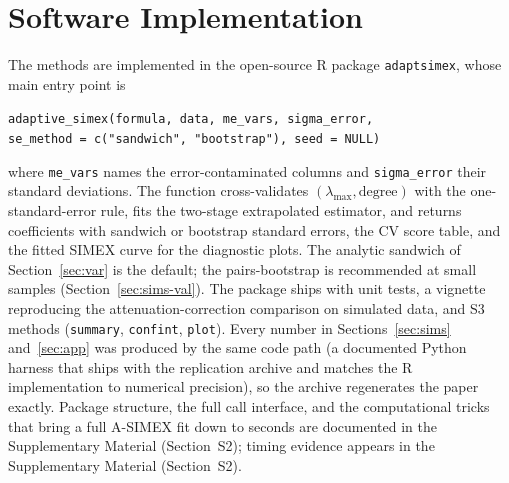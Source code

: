 \section{Software Implementation}\label{sec:software}

The methods are implemented in the open-source R package
\texttt{adaptsimex}, whose main entry point is

\begin{center}
\small
\begin{minipage}{0.9\textwidth}
\texttt{adaptive\_simex(formula, data, me\_vars, sigma\_error,\\
\quad se\_method = c("sandwich", "bootstrap"), seed = NULL)}
\end{minipage}
\end{center}

\noindent where \texttt{me\_vars} names the error-contaminated
columns and \texttt{sigma\_error} their standard deviations. The
function cross-validates $(\lambda_{\max},\text{degree})$ with the
one-standard-error rule, fits the two-stage extrapolated estimator,
and returns coefficients with sandwich or bootstrap standard errors,
the CV score table, and the fitted SIMEX curve for the diagnostic
plots. The analytic sandwich of Section~\ref{sec:var} is the default;
the pairs-bootstrap is recommended at small samples
(Section~\ref{sec:sims-val}). The package ships with unit tests, a
vignette reproducing the attenuation-correction comparison on
simulated data, and S3 methods (\texttt{summary}, \texttt{confint},
\texttt{plot}). Every number in Sections~\ref{sec:sims}
and~\ref{sec:app} was produced by the same code path (a documented
Python harness that ships with the replication archive and matches
the R implementation to numerical precision), so the archive
regenerates the paper exactly. Package structure, the full call
interface, and the computational tricks that bring a full A-SIMEX fit
down to seconds are documented in the Supplementary Material (Section~S2);
timing evidence appears in the Supplementary Material (Section~S2).

